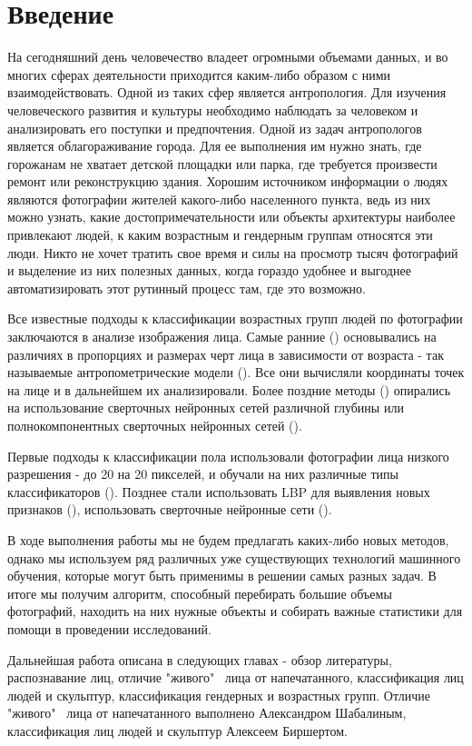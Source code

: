 \documentclass[a4paper,14pt]{extarticle}
\begin{document}
    \section{Введение}\label{sec:введение}

    На сегодняшний день человечество владеет огромными объемами данных, и во многих сферах деятельности приходится каким-либо образом с ними взаимодействовать.
    Одной из таких сфер является антропология.
    Для изучения человеческого развития и культуры необходимо наблюдать за человеком и анализировать его поступки и предпочтения.
    Одной из задач антропологов является облагораживание города.
    Для ее выполнения им нужно знать, где горожанам не хватает детской площадки или парка, где требуется произвести ремонт или реконструкцию здания.
    Хорошим источником информации о людях являются фотографии жителей какого-либо населенного пункта, ведь из них можно узнать, какие достопримечательности или объекты архитектуры наиболее привлекают людей, к каким возрастным и гендерным группам относятся эти люди.
    Никто не хочет тратить свое время и силы на просмотр тысяч фотографий и выделение из них полезных данных, когда гораздо удобнее и выгоднее автоматизировать этот рутинный процесс там, где это возможно.
    \par Все известные подходы к классификации возрастных групп людей по фотографии заключаются в анализе изображения лица.
    Самые ранние (\cite{age1994}) основывались на различиях в пропорциях и размерах черт лица в зависимости от возраста - так называемые антропометрические модели (\cite{unfiltered}).
    Все они вычисляли координаты точек на лице и в дальнейшем их анализировали.
    Более поздние методы (\cite{hassner}) опирались на использование сверточных нейронных сетей различной глубины или полнокомпонентных сверточных нейронных сетей (\cite{INDIA}).
    \par Первые подходы к классификации пола использовали фотографии лица низкого разрешения - до 20 на 20 пикселей, и обучали на них различные типы классификаторов (\cite{smoll}).
    Позднее стали использовать LBP для выявления новых признаков (\cite{lbp_age}), использовать сверточные нейронные сети (\cite{hassner,INDIA}).
    \par В ходе выполнения работы мы не будем предлагать каких-либо новых методов, однако мы используем ряд различных уже существующих технологий машинного обучения, которые могут быть применимы в решении самых разных задач.
    В итоге мы получим алгоритм, способный перебирать большие объемы фотографий, находить на них нужные объекты и собирать важные статистики для помощи в проведении исследований.
    \par Дальнейшая работа описана в следующих главах - обзор литературы, распознавание лиц, отличие "живого" \, лица от напечатанного, классификация лиц людей и скульптур, классификация гендерных и возрастных групп.
    Отличие "живого" \, лица от напечатанного выполнено Александром Шабалиным, классификация лиц людей и скульптур Алексеем Биршертом.
    \newpage
\end{document}
